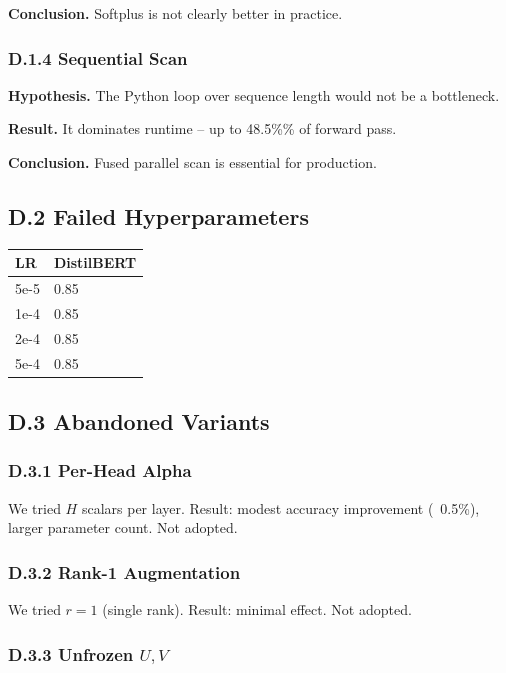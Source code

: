 \textbf{Conclusion.} Softplus is not clearly better in practice.

\subsubsection{D.1.4 Sequential Scan}

\textbf{Hypothesis.} The Python loop over sequence length would not be a 
bottleneck.

\textbf{Result.} It dominates runtime -- up to 48.5\%\% of forward pass.

\textbf{Conclusion.} Fused parallel scan is essential for production.

\subsection{D.2 Failed Hyperparameters}

\begin{table}[H]
\centering
\small
\begin{tabular}{ll}
\toprule
\textbf{LR} & \textbf{DistilBERT} \\
\midrule
5e-5 & 0.85 \\
1e-4 & 0.85 \\
2e-4 & 0.85 \\
5e-4 & 0.85 \\
\bottomrule
\end{tabular}
\end{table}

\subsection{D.3 Abandoned Variants}

\subsubsection{D.3.1 Per-Head Alpha}

We tried $H$ scalars per layer. Result: modest accuracy improvement (~0.5\%), 
larger parameter count. Not adopted.

\subsubsection{D.3.2 Rank-1 Augmentation}

We tried $r = 1$ (single rank). Result: minimal effect. Not adopted.

\subsubsection{D.3.3 Unfrozen $U, V$}

